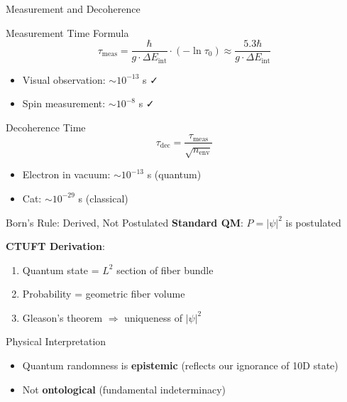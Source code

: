 \documentclass[aspectratio=169]{beamer}
\begin{document}
\begin{frame}{Measurement and Decoherence}
\begin{block}{Measurement Time Formula}
\[
\tau_{\text{meas}} = \frac{\hbar}{g \cdot \Delta E_{\text{int}}} \cdot (-\ln \tau_0) \approx \frac{5.3\hbar}{g \cdot \Delta E_{\text{int}}}
\]
\begin{itemize}
    \item Visual observation: $\sim 10^{-13}$ s ✓
    \item Spin measurement: $\sim 10^{-8}$ s ✓
\end{itemize}
\end{block}

\begin{block}{Decoherence Time}
\[
\tau_{\text{dec}} = \frac{\tau_{\text{meas}}}{\sqrt{n_{\text{env}}}}
\]
\begin{itemize}
    \item Electron in vacuum: $\sim 10^{-13}$ s (quantum)
    \item Cat: $\sim 10^{-29}$ s (classical)
\end{itemize}
\end{block}
\end{frame}

\begin{frame}{Born's Rule: Derived, Not Postulated}
\textbf{Standard QM}: $P = |\psi|^2$ is postulated

\vspace{0.5cm}

\textbf{CTUFT Derivation}:
\begin{enumerate}
    \item Quantum state = $L^2$ section of fiber bundle
    \item Probability = geometric fiber volume
    \item Gleason's theorem $\Rightarrow$ uniqueness of $|\psi|^2$
\end{enumerate}

\vspace{0.5cm}

\begin{alertblock}{Physical Interpretation}
\begin{itemize}
    \item Quantum randomness is \textbf{epistemic}
    (reflects our ignorance of 10D state)
    \item Not \textbf{ontological}
    (fundamental indeterminacy)
\end{itemize}
\end{alertblock}
\end{frame}
\end{document}

